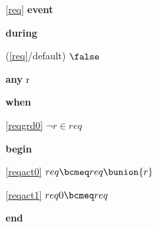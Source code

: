 \noindent \ref{req}  \textbf{event}
\begin{block}
  \item   \textbf{during}
  \begin{block}
  \item[ (\ref{req}/default) ]{$\false$} %
  \end{block}
  \item   \textbf{any} r
  \item   \textbf{when}
  \begin{block}
  \item[ \eqref{reqgrd0} ]{$\neg r \in req$} %
  \end{block}
  \item   \textbf{begin}
  \begin{block}
  \item[ \eqref{reqact0} ]{$req \bcmeq req \bunion \{ r \}$} %
  \item[ \eqref{reqact1} ]{$req0 \bcmeq req$} %
  \end{block}
  \item   \textbf{end} \\
\end{block}
